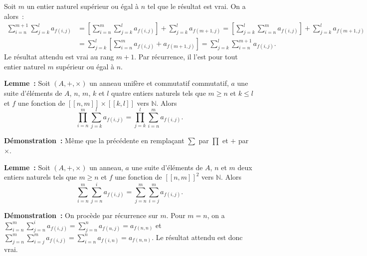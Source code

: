     Soit $m$ un entier naturel supérieur ou égal à $n$ tel que le résultat est vrai.
    On a alors : 
    \begin{equation*}
        \begin{aligned}
            \sum_{i=n}^{m+1} \sum_{j=k}^l a_{f(i,j)}
            & = \left[ \sum_{i=n}^m \sum_{j=k}^l a_{f(i,j)} \right] + \sum_{j=k}^l a_{f(m+1,j)}
              = \left[ \sum_{j=k}^l \sum_{i=n}^m a_{f(i,j)} \right] + \sum_{j=k}^l a_{f(m+1,j)}
              \\
            & = \sum_{j=k}^l \left[ \sum_{i=n}^{m} a_{f(i,j)} + a_{f(m+1,j)} \right]
              = \sum_{j=k}^l \sum_{i=n}^{m+1} a_{f(i,j)}.
        \end{aligned}
    \end{equation*}
    Le résultat attendu est vrai au rang $m+1$. 
    Par récurrence, il l'est pour tout entier naturel $m$ supérieur ou égal à $n$.

    \done

\medskip

\noindent\textbf{Lemme :} Soit $(A, +, \times)$ un anneau unifère et commutatif commutatif, $a$ une suite d'éléments de $A$, $n$, $m$, $k$ et $l$ quatre entiers naturels tels que $m \geq n$ et $k \leq l$ et $f$ une fonction de $[\![n, m]\!] \times [\![k, l]\!]$ vers $\mathbb{N}$.
    Alors
    \begin{equation*}
        \prod_{i=n}^m \sum_{j=k}^l a_{f(i,j)}
             = \prod_{j=k}^l \sum_{i=n}^m a_{f(i,j)} .
    \end{equation*}

\medskip

\noindent\textbf{Démonstration :} Même que la précédente en remplaçant $\sum$ par $\prod$ et $+$ par $\times$.

\medskip

\noindent\textbf{Lemme :} Soit $(A, +, \times)$ un anneau, $a$ une suite d'éléments de $A$, $n$ et $m$ deux entiers naturels tels que $m \geq n$ et $f$ une fonction de $[\![n, m]\!]^2$ vers $\mathbb{N}$.
    Alors
    \begin{equation*}
        \sum_{i=n}^m \sum_{j=n}^i a_{f(i,j)}
             = \sum_{j=n}^m \sum_{i=j}^m a_{f(i,j)} .
    \end{equation*}

\medskip

\noindent\textbf{Démonstration :} On procède par récurrence sur $m$. 
    Pour $m = n$, on a $\sum_{i=n}^m \sum_{j=n}^i a_{f(i,j)} = \sum_{j=n}^n a_{f(n,j)} = a_{f(n,n)}$ et $\sum_{j=n}^m \sum_{i=j}^m a_{f(i,j)} = \sum_{i=n}^n a_{f(i,n)} = a_{f(n,n)}$.
    Le résultat attendu est donc vrai. 

